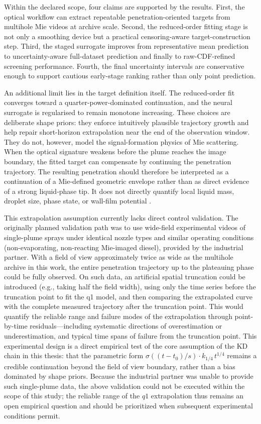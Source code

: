 \documentclass[english, 12pt, a4paper, elec, utf8, a-2b, online]{aaltothesis}
\begin{document}
Within the declared scope, four claims are supported by the results. First, the optical workflow can extract repeatable penetration-oriented targets from multihole Mie videos at archive scale. Second, the reduced-order fitting stage is not only a smoothing device but a practical censoring-aware target-construction step. Third, the staged surrogate improves from representative mean prediction to uncertainty-aware full-dataset prediction and finally to raw-CDF-refined screening performance. Fourth, the final uncertainty intervals are conservative enough to support cautious early-stage ranking rather than only point prediction.

An additional limit lies in the target definition itself. The reduced-order fit converges toward a quarter-power-dominated continuation, and the neural surrogate is regularised to remain monotone increasing. These choices are deliberate shape priors: they enforce intuitively plausible trajectory growth and help repair short-horizon extrapolation near the end of the observation window. They do not, however, model the signal-formation physics of Mie scattering. When the optical signature weakens before the plume reaches the image boundary, the fitted target can compensate by continuing the penetration trajectory. The resulting penetration should therefore be interpreted as a continuation of a Mie-defined geometric envelope rather than as direct evidence of a strong liquid-phase tip. It does not directly quantify local liquid mass, droplet size, phase state, or wall-film potential \cite{ecn_liquid_penetration,ecn_liquid_penetration_accessory}.

This extrapolation assumption currently lacks direct control validation. The originally planned validation path was to use wide-field experimental videos of single-plume sprays under identical nozzle types and similar operating conditions (non-evaporating, non-reacting Mie-imaged diesel), provided by the industrial partner. With a field of view approximately twice as wide as the multihole archive in this work, the entire penetration trajectory up to the plateauing phase could be fully observed. On such data, an artificial spatial truncation could be introduced (e.g., taking half the field width), using only the time series before the truncation point to fit the q1 model, and then comparing the extrapolated curve with the complete measured trajectory after the truncation point. This would quantify the reliable range and failure modes of the extrapolation through point-by-time residuals---including systematic directions of overestimation or underestimation, and typical time spans of failure from the truncation point. This experimental design is a direct empirical test of the core assumption of the KD chain in this thesis: that the parametric form $\sigma\!\left((t-t_0)/s\right)\cdot k_{1/4}\,t^{1/4}$ remains a credible continuation beyond the field of view boundary, rather than a bias dominated by shape priors. Because the industrial partner was unable to provide such single-plume data, the above validation could not be executed within the scope of this study; the reliable range of the $q1$ extrapolation thus remains an open empirical question and should be prioritized when subsequent experimental conditions permit.
\end{document}
